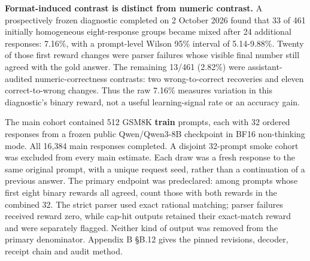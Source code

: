 \documentclass[12pt,a4paper]{report}
\begin{document}
\textbf{Format-induced contrast is distinct from numeric contrast.} A
prospectively frozen diagnostic completed on 2 October 2026 found that
33 of 461 initially homogeneous eight-response groups became mixed after
24 additional responses: 7.16\%, with a prompt-level Wilson 95\%
interval of 5.14-9.88\%. Twenty of those first reward changes were
parser failures whose visible final number still agreed with the gold
answer. The remaining 13/461 (2.82\%) were assistant-audited
numeric-correctness contrasts: two wrong-to-correct recoveries and
eleven correct-to-wrong changes. Thus the raw 7.16\% measures variation
in this diagnostic's binary reward, not a useful learning-signal rate or
an accuracy gain.

The main cohort contained 512 GSM8K \textbf{train} prompts, each with 32
ordered responses from a frozen public Qwen/Qwen3-8B checkpoint in BF16
non-thinking mode. All 16,384 main responses completed. A disjoint
32-prompt smoke cohort was excluded from every main estimate. Each draw
was a fresh response to the same original prompt, with a unique request
seed, rather than a continuation of a previous answer. The primary
endpoint was predeclared: among prompts whose first eight binary rewards
all agreed, count those with both rewards in the combined 32. The strict
parser used exact rational matching; parser failures received reward
zero, while cap-hit outputs retained their exact-match reward and were
separately flagged. Neither kind of output was removed from the primary
denominator. Appendix B §B.12 gives the pinned revisions, decoder,
receipt chain and audit method.
\end{document}
